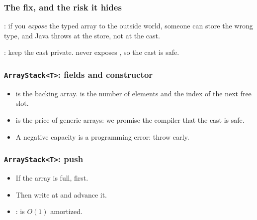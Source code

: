 \documentclass[aspectratio=169,10pt,compress]{beamer}
\begin{document}
\begin{frame}[t,fragile] \frametitle{The fix, and the risk it hides}
  \vspace{0.2em}
  \small
  : if you \emph{expose} the typed array to the
  outside world, someone can store the wrong type, and Java throws
   at the store, not at the cast.
  \vspace{0.2em}

  \vspace{0.1em}
  \small
  : keep the cast private.  never
  exposes , so the cast is safe.
\end{frame}





\begin{frame}[t,fragile] \frametitle{\texttt{ArrayStack<T>}: fields and constructor}
  \begin{itemize}\small
    \item {} is the backing array.  is the number of elements
          and the index of the next free slot.
    \item {} is the price of generic arrays:
          we promise the compiler that the cast is safe.
    \item A negative capacity is a programming error: throw early.
  \end{itemize}
\end{frame}




\begin{frame}[t,fragile] \frametitle{\texttt{ArrayStack<T>}: push}
  \begin{itemize}\small
    \item If the array is full,  first.
    \item Then write at  and advance it.
    \item {}:  is $O(1)$
          amortized.
  \end{itemize}
\end{frame}
\end{document}
